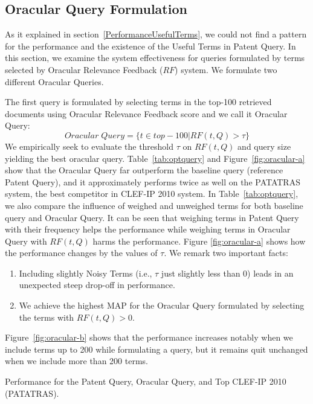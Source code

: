 \subsection{Oracular Query Formulation}
\label{sec:OracularQueryFormulation}
As it explained in section~\ref{PerformanceUsefulTerms}, we could not find a pattern for the performance and the existence of the Useful Terms in Patent Query.
In this section, we examine the system effectiveness for queries formulated by terms selected by Oracular Relevance Feedback ($\mathit{RF}$) system.
We formulate two different Oracular Queries.

The first query is formulated by selecting terms in the top-100 retrieved documents using Oracular Relevance Feedback score and we call it Oracular Query:
\begin{equation}
Oracular \; Query = \{t \in top-100|RF(t, Q)>\tau\}   
 \label{eq:score}
\end{equation}
We empirically seek to evaluate the threshold $\tau$ on $RF(t,Q)$ and query size yielding the best oracular query.
Table~\ref{tab:optquery} and Figure~\ref{fig:oracular-a} show that the Oracular Query far outperform the baseline query (reference Patent Query), and it approximately performs twice as well on the PATATRAS system, the best competitor in CLEF-IP 2010 system. In Table~\ref{tab:optquery}, we also compare the influence of weighed and unweighed terms for both baseline query and Oracular Query. It can be seen that weighing terms in Patent Query with their frequency helps the performance while weighing terms in Oracular Query with $RF(t, Q)$ harms the performance. 
Figure \ref{fig:oracular-a} shows how the performance changes by the values of $\tau$. We remark two important facts: 
\begin{enumerate}
\item Including slightly Noisy Terms (i.e., $\tau$ just slightly less than 0) leads in an unexpected steep drop-off in performance.  
\item We achieve the highest MAP for the Oracular Query formulated by selecting the terms with $RF(t, Q)>0$.
\end{enumerate}
Figure~\ref{fig:oracular-b} shows that the performance increases notably when we include terms up to 200 while formulating a query, but it remains quit unchanged when we include more than 200 terms. 
\begin{table}[t!]
  \begin{center}
  \scriptsize
   \caption{Performance for the Patent Query, Oracular Query, and Top CLEF-IP 2010 (PATATRAS).}
   \vspace*{1ex}
     
  \label{tab:optquery}
  \end{center}  
\end{table}

